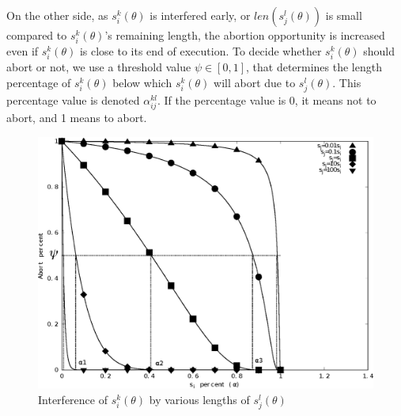 \documentclass[conference]{IEEEtran}
\begin{document}
On the other side, as $s_{i}^{k}(\theta)$ is interfered early,
or $len(s_{j}^{l}(\theta))$ is small compared to $s_{i}^{k}(\theta)$'s remaining length, the abortion opportunity 
is increased even if $s_i^k (\theta)$ is close to its end of execution. To decide whether $s_{i}^{k}(\theta)$ should abort or not, we use a threshold value $\psi\in[0,1]$, that determines
the length percentage of $s_{i}^{k}(\theta)$ below which $s_{i}^{k}(\theta)$ will abort due to $s_{j}^{l}(\theta)$. This percentage value is denoted $\alpha_{ij}^{kl}$. 
%
If the percentage value is 0, it means not to abort, and 1 means to abort. 


%
\begin{figure}[htbp]
\centering
\includegraphics[scale=0.4]{figures/figure16}
\caption{\label{fig16}Interference of $s_{i}^{k}(\theta)$ by various lengths of 
$s_{j}^{l}(\theta)$}
\end{figure}
\end{document}
